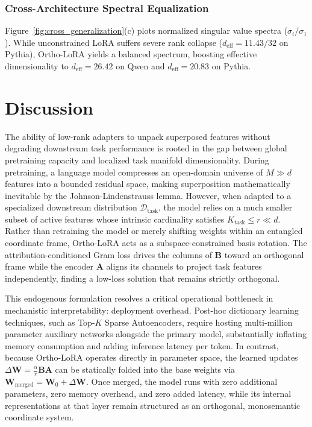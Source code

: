 \documentclass[10pt,twocolumn,letterpaper]{article}
\begin{document}
\subsubsection{Cross-Architecture Spectral Equalization}
Figure~\ref{fig:cross_generalization}(c) plots normalized singular value spectra ($\sigma_i / \sigma_1$). While unconstrained LoRA suffers severe rank collapse ($d_{\text{eff}} = 11.43 / 32$ on Pythia), Ortho-LoRA yields a balanced spectrum, boosting effective dimensionality to $d_{\text{eff}} = 26.42$ on Qwen and $d_{\text{eff}} = 20.83$ on Pythia.

\section{Discussion}
\label{sec:discussion}

The ability of low-rank adapters to unpack superposed features without degrading downstream task performance is rooted in the gap between global pretraining capacity and localized task manifold dimensionality. During pretraining, a language model compresses an open-domain universe of $M \gg d$ features into a bounded residual space, making superposition mathematically inevitable by the Johnson-Lindenstrauss lemma. However, when adapted to a specialized downstream distribution $\mathcal{D}_{\text{task}}$, the model relies on a much smaller subset of active features whose intrinsic cardinality satisfies $K_{\text{task}} \le r \ll d$. Rather than retraining the model or merely shifting weights within an entangled coordinate frame, Ortho-LoRA acts as a subspace-constrained basis rotation. The attribution-conditioned Gram loss drives the columns of $\bm{B}$ toward an orthogonal frame while the encoder $\bm{A}$ aligns its channels to project task features independently, finding a low-loss solution that remains strictly orthogonal.

This endogenous formulation resolves a critical operational bottleneck in mechanistic interpretability: deployment overhead. Post-hoc dictionary learning techniques, such as Top-$K$ Sparse Autoencoders, require hosting multi-million parameter auxiliary networks alongside the primary model, substantially inflating memory consumption and adding inference latency per token. In contrast, because Ortho-LoRA operates directly in parameter space, the learned updates $\Delta \bm{W} = \frac{\alpha}{r}\bm{B}\bm{A}$ can be statically folded into the base weights via $\bm{W}_{\text{merged}} = \bm{W}_0 + \Delta \bm{W}$. Once merged, the model runs with zero additional parameters, zero memory overhead, and zero added latency, while its internal representations at that layer remain structured as an orthogonal, monosemantic coordinate system.
\end{document}
